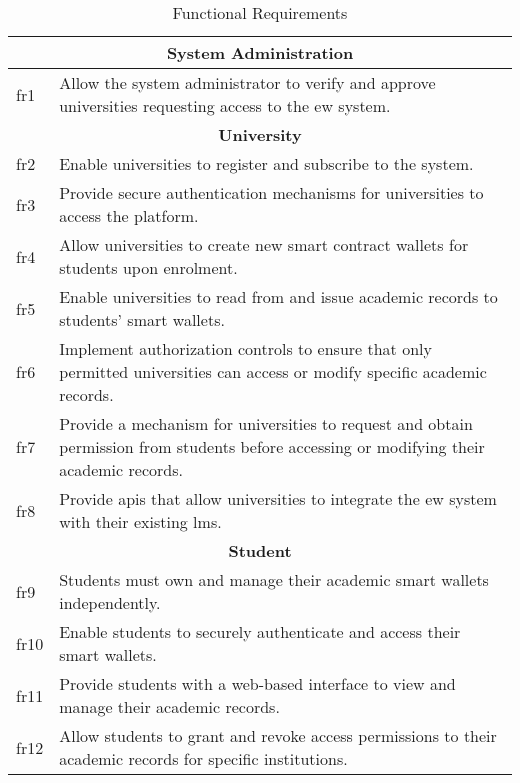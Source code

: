 \begin{table}
\centering
\caption{Functional Requirements}
\label{tab:funcReq}
\begin{tabular}{|p{1.0cm}|p{11cm}|}
\hline
\multicolumn{2}{|c|}{\textbf{System Administration}} \\
\hline
\gls{fr}1 & Allow the system administrator to verify and approve universities requesting access to the \gls{ew} system. \\
\hline
\multicolumn{2}{|c|}{\textbf{University}} \\
\hline
\gls{fr}2 & Enable universities to register and subscribe to the system. \\
\gls{fr}3 & Provide secure authentication mechanisms for universities to access the platform. \\
\gls{fr}4 & Allow universities to create new smart contract wallets for students upon enrolment. \\
\gls{fr}5 & Enable universities to read from and issue academic records to students' smart wallets. \\
\gls{fr}6 & Implement authorization controls to ensure that only permitted universities can access or modify specific academic records. \\
\gls{fr}7 & Provide a mechanism for universities to request and obtain permission from students before accessing or modifying their academic records. \\
\gls{fr}8 & Provide \glspl{api} that allow universities to integrate the \gls{ew} system with their existing \gls{lms}. \\
\hline
\multicolumn{2}{|c|}{\textbf{Student}} \\
\hline
\gls{fr}9  & Students must own and manage their academic smart wallets independently. \\
\gls{fr}10 & Enable students to securely authenticate and access their smart wallets. \\
\gls{fr}11 & Provide students with a web-based interface to view and manage their academic records. \\
\gls{fr}12 & Allow students to grant and revoke access permissions to their academic records for specific institutions. \\
\hline
\end{tabular}
\end{table}